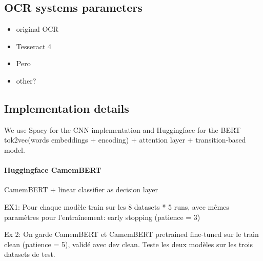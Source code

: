  




\subsection{OCR systems parameters}
\begin{itemize}
    \item original OCR
    \item Tesseract 4
    \item Pero
    \item other?
\end{itemize}

\subsection{Implementation details}
We use Spacy for the CNN implementation
and Huggingface for the BERT 
tok2vec(words embeddings + encoding) + attention layer  +  transition-based model.

\paragraph{Huggingface CamemBERT}
CamemBERT + linear classifier as decision layer

EX1: Pour chaque modèle train sur les 8 datasets * 5 runs, avec mêmes paramètres pour l’entraînement: early stopping  (patience = 3)

Ex 2: On garde CamemBERT et CamemBERT pretrained fine-tuned sur le train clean (patience = 5), validé avec dev clean. Teste les deux modèles sur les trois datasets de test.